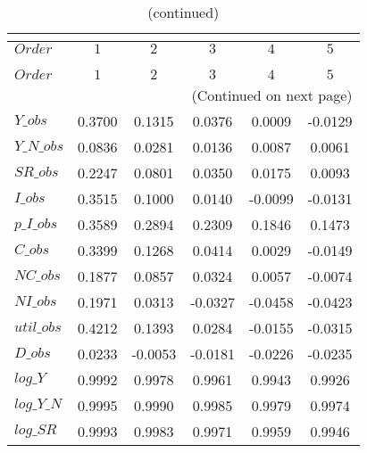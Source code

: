  
\begin{center}
\begin{longtable}{lccccc} 
\caption{COEFFICIENTS OF AUTOCORRELATION}\\
 \label{Table:th_autocorr_matrix}\\
\toprule 
$Order      $	 & 	 $         1$	 & 	 $         2$	 & 	 $         3$	 & 	 $         4$	 & 	 $         5$\\
\midrule \endfirsthead 
\caption{(continued)}\\
 \toprule \\ 
$Order      $	 & 	 $         1$	 & 	 $         2$	 & 	 $         3$	 & 	 $         4$	 & 	 $         5$\\
\midrule \endhead 
\midrule \multicolumn{6}{r}{(Continued on next page)} \\ \bottomrule \endfoot 
\bottomrule \endlastfoot 
$Y\_obs     $	 & 	    0.3700	 & 	    0.1315	 & 	    0.0376	 & 	    0.0009	 & 	   -0.0129 \\ 
$Y\_N\_obs  $	 & 	    0.0836	 & 	    0.0281	 & 	    0.0136	 & 	    0.0087	 & 	    0.0061 \\ 
$SR\_obs    $	 & 	    0.2247	 & 	    0.0801	 & 	    0.0350	 & 	    0.0175	 & 	    0.0093 \\ 
$I\_obs     $	 & 	    0.3515	 & 	    0.1000	 & 	    0.0140	 & 	   -0.0099	 & 	   -0.0131 \\ 
$p\_I\_obs  $	 & 	    0.3589	 & 	    0.2894	 & 	    0.2309	 & 	    0.1846	 & 	    0.1473 \\ 
$C\_obs     $	 & 	    0.3399	 & 	    0.1268	 & 	    0.0414	 & 	    0.0029	 & 	   -0.0149 \\ 
$NC\_obs    $	 & 	    0.1877	 & 	    0.0857	 & 	    0.0324	 & 	    0.0057	 & 	   -0.0074 \\ 
$NI\_obs    $	 & 	    0.1971	 & 	    0.0313	 & 	   -0.0327	 & 	   -0.0458	 & 	   -0.0423 \\ 
$util\_obs  $	 & 	    0.4212	 & 	    0.1393	 & 	    0.0284	 & 	   -0.0155	 & 	   -0.0315 \\ 
$D\_obs     $	 & 	    0.0233	 & 	   -0.0053	 & 	   -0.0181	 & 	   -0.0226	 & 	   -0.0235 \\ 
$log\_Y     $	 & 	    0.9992	 & 	    0.9978	 & 	    0.9961	 & 	    0.9943	 & 	    0.9926 \\ 
$log\_Y\_N  $	 & 	    0.9995	 & 	    0.9990	 & 	    0.9985	 & 	    0.9979	 & 	    0.9974 \\ 
$log\_SR    $	 & 	    0.9993	 & 	    0.9983	 & 	    0.9971	 & 	    0.9959	 & 	    0.9946 \\ 

\end{longtable}
\end{center}
